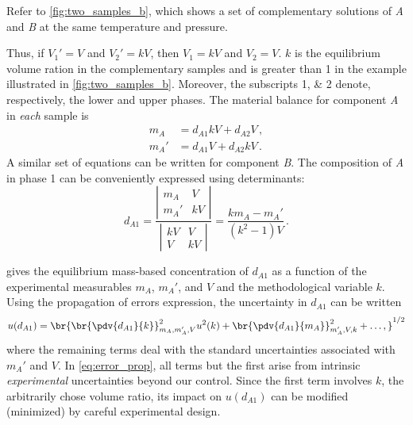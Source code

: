 Refer to \cref{fig:two_samples_b}, which shows a set of complementary solutions of \emph{A} and \emph{B} at the same temperature and pressure. 

Thus, if \(V_1' = V\) and \(V_2' = kV\), then \(V_1 = kV\) and \(V_2 = V\). 
\(k\) is the equilibrium volume ration in the complementary samples and is greater than \num{1} in the example illustrated in \cref{fig:two_samples_b}. 
Moreover, the subscripts \numlist{1;2} denote, respectively, the lower and upper phases. 
The material balance for component \emph{A} in \emph{each} sample is 
\begin{equation}
\begin{aligned}
  m_A  &= d_{A1} k V + d_{A2} V \, , \\
  m_A' &= d_{A1} V + d_{A2} k V \, . 
\end{aligned}
\label{eq:mat_balance}
\end{equation}
A similar set of equations can be written for component \emph{B}. 
The composition of \emph{A} in phase \num{1} can be conveniently expressed using determinants:
\begin{equation}
  d_{A1} = 
    \frac{
      \left|
      \begin{matrix}
        m_A & V \\ m_A' & kV
      \end{matrix}
      \right|}
      {
      \left|\begin{matrix}
        kV & V \\ V & kV
      \end{matrix} 
      \right|} = 
    \frac{k m_A - m_A'}{(k^2 - 1)V} \, .
  \label{eq:composition_a1}
\end{equation}

 gives the equilibrium mass-based concentration of \(d_{A1}\) as a function of the experimental measurables \(m_A\), \(m_A'\), and \(V\) and the methodological variable \(k\). 
Using the propagation of errors expression, the uncertainty in \(d_{A1}\) can be written 
\begin{equation}
  u(d_{A1}) = \br{\br{\pdv{d_{A1}}{k}}^2_{m_A,m_A',V} u^2(k) + \br{\pdv{d_{A1}}{m_A}}^2_{m_A',V,k} + \dots,}^{1/2}
  \label{eq:error_prop}
\end{equation}
where the remaining terms deal with the standard uncertainties associated with \(m_A'\) and \(V\). 
In \cref{eq:error_prop}, all terms but the first arise from intrinsic \emph{experimental} uncertainties beyond our control. 
Since the first term involves \(k\), the arbitrarily chose volume ratio, its impact on \(u(d_{A1})\)  can be modified (minimized) by careful experimental design. 

